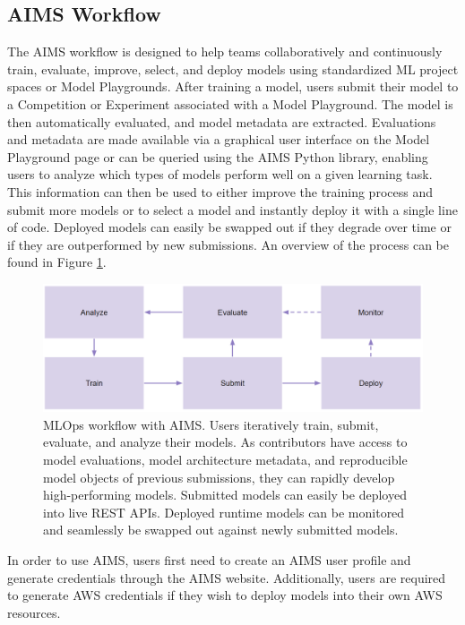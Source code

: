 \subsection{AIMS Workflow}
The AIMS workflow is designed to help teams collaboratively and continuously train, evaluate, improve, select, and deploy models using standardized ML project spaces or Model Playgrounds. After training a model, users submit their model to a Competition or Experiment associated with a Model Playground. The model is then automatically evaluated, and model metadata are extracted. Evaluations and metadata are made available via a graphical user interface on the Model Playground page or can be queried using the AIMS Python library, enabling users to analyze which types of models perform well on a given learning task. This information can then be used to either improve the training process and submit more models or to select a model and instantly deploy it with a single line of code. Deployed models can easily be swapped out if they degrade over time or if they are outperformed by new submissions. An overview of the process can be found in Figure \ref{fig:fig_aims_workflow}.


\begin{figure}
  \centering
  \includegraphics[width=1\textwidth]{figures/fig_aims_workflow.png}
  \caption{MLOps workflow with AIMS. Users iteratively train, submit, evaluate, and analyze their models. As contributors have access to model evaluations, model architecture metadata, and reproducible model objects of previous submissions, they can rapidly develop high-performing models. Submitted models can easily be deployed into live REST APIs. Deployed runtime models can be monitored and seamlessly be swapped out against newly submitted models.}
  \label{fig:fig_aims_workflow}
\end{figure}


In order to use AIMS, users first need to create an AIMS user profile and generate credentials through the AIMS website. Additionally, users are required to generate AWS credentials if they wish to deploy models into their own AWS resources. 

